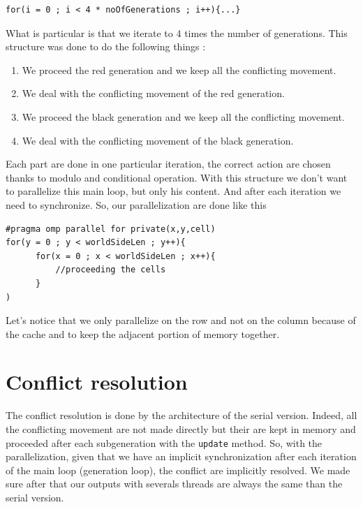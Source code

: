 \documentclass[a4paper,10pt]{article}
\begin{document}
\begin{lstlisting}
for(i = 0 ; i < 4 * noOfGenerations ; i++){...}
\end{lstlisting}

What is particular is that we iterate to 4 times the number of generations. This structure was done to do the following things :

\begin{enumerate}
 \item We proceed the red generation and we keep all the conflicting movement.
 \item We deal with the conflicting movement of the red generation.
 \item We proceed the black generation and we keep all the conflicting movement.
 \item We deal with the conflicting movement of the black generation.
\end{enumerate}

Each part are done in one particular iteration, the correct action are chosen thanks to modulo and conditional operation.
With this structure we don't want to parallelize this main loop, but only his content. 
And after each iteration we need to synchronize. So, our parallelization are done like this 

\begin{lstlisting}
#pragma omp parallel for private(x,y,cell)
for(y = 0 ; y < worldSideLen ; y++){
      for(x = 0 ; x < worldSideLen ; x++){
	      //proceeding the cells
      }
)
\end{lstlisting}

Let's notice that we only parallelize on the row and not on the column because of the cache and to keep the adjacent portion of memory
together.

\section*{Conflict resolution}

The conflict resolution is done by the architecture of the serial version. Indeed, all the conflicting movement are not made
directly but their are kept in memory and proceeded after each subgeneration with the \texttt{update} method.
So, with the parallelization, given that we have an implicit synchronization after each iteration of the main loop (generation loop),
the conflict are implicitly resolved. We made sure after that our outputs with severals threads are always the same than the serial version.
\end{document}
